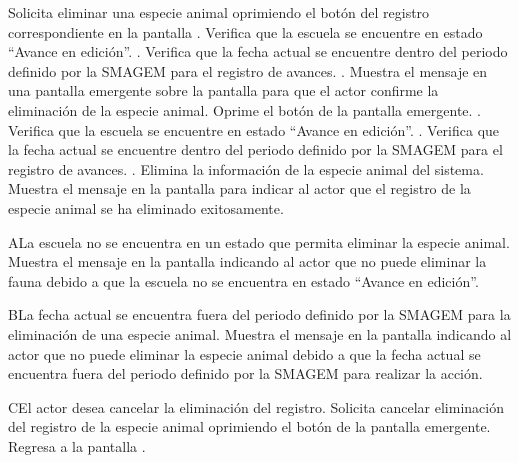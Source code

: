  \begin{UCtrayectoria}
    \UCpaso[\UCactor] Solicita eliminar una especie animal oprimiendo el botón \botKo del registro correspondiente en la pantalla .
    \UCpaso[\UCsist] Verifica que la escuela se encuentre en estado ``Avance en edición''. .
    \UCpaso[\UCsist] Verifica que la fecha actual se encuentre dentro del periodo definido por la SMAGEM para el registro de avances. .
    \UCpaso[\UCsist] Muestra el mensaje  en una pantalla emergente sobre la pantalla  para que el actor confirme la eliminación de la especie animal.
    \UCpaso[\UCactor] Oprime el botón  de la pantalla emergente. .
     \UCpaso[\UCsist] Verifica que la escuela se encuentre en estado ``Avance en edición''. .
    \UCpaso[\UCsist] Verifica que la fecha actual se encuentre dentro del periodo definido por la SMAGEM para el registro de avances. .
    \UCpaso[\UCsist] Elimina la información de la especie animal del sistema.
    \UCpaso[\UCsist] Muestra el mensaje  en la pantalla  para indicar al actor que el registro de la especie animal se ha eliminado exitosamente.    
 \end{UCtrayectoria}
 
   \begin{UCtrayectoriaA}{A}{La escuela no se encuentra en un estado que permita eliminar la especie animal.}
    \UCpaso[\UCsist] Muestra el mensaje  en la pantalla  indicando al actor que no puede eliminar la fauna debido a que la escuela no se encuentra en estado ``Avance en edición''. 
 \end{UCtrayectoriaA}

   \begin{UCtrayectoriaA}{B}{La fecha actual se encuentra fuera del periodo definido por la SMAGEM para la eliminación de una especie animal.}
    \UCpaso[\UCsist] Muestra el mensaje  en la pantalla  indicando al actor que no puede eliminar la especie animal debido a que la fecha actual se encuentra fuera del periodo definido por la SMAGEM para realizar la acción. 
 \end{UCtrayectoriaA}
 
    \begin{UCtrayectoriaA}{C}{El actor desea cancelar la eliminación del registro.}
    \UCpaso[\UCactor] Solicita cancelar eliminación del registro de la especie animal oprimiendo el botón  de la pantalla emergente.
    \UCpaso[] Regresa a la pantalla .    
 \end{UCtrayectoriaA}
